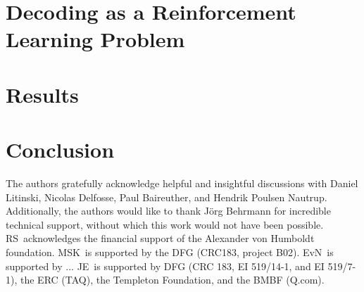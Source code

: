 \documentclass[twocolumn,preprintnumbers,amsmath,amssymb,notitlepage,nofootinbib,longbibliography,superscriptaddress,aps,pra,10pt]{revtex4-1}
\begin{document}
\section{Decoding as a Reinforcement Learning Problem}\label{s:decoding_as_rl}
\section{Results}\label{s:results}
\section{Conclusion}\label{s:conclusions}


\begin{acknowledgments}
	The authors gratefully acknowledge helpful and insightful discussions with Daniel Litinski, Nicolas Delfosse, Paul Baireuther, and Hendrik Poulsen Nautrup.
	Additionally, the authors would like to thank J\"{o}rg Behrmann for incredible technical support, without which this work would not have been possible.
	RS\ acknowledges the financial support of the Alexander von Humboldt foundation.
	MSK\ is supported by the DFG (CRC183, project B02).
	EvN\ is supported by ...
	JE\ is supported by DFG (CRC 183, EI 519/14-1, and EI 519/7-1), the ERC (TAQ), the Templeton Foundation, and the BMBF (Q.com).
\end{acknowledgments}


\end{document}
